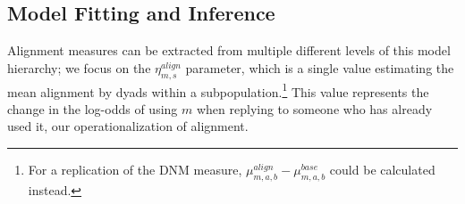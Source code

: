 \documentclass{acm_proc_article-sp}
\begin{document}


\subsection{Model Fitting and Inference}
Alignment measures can be extracted from multiple different levels of this model hierarchy; we focus on the $\eta^{align}_{m,s}$ parameter, which is a single value estimating the mean alignment by dyads within a subpopulation.\footnote{For a replication of the DNM measure, $\mu^{align}_{m,a,b}-\mu^{base}_{m,a,b}$ could be calculated instead.}  This value represents the change in the log-odds of using $m$ when replying to someone who has already used it, our operationalization of alignment.
\end{document}
